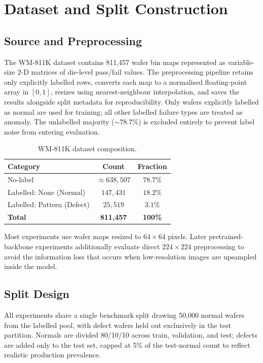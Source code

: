 \documentclass[11pt]{article}
\begin{document}
\section{Dataset and Split Construction}

\subsection{Source and Preprocessing}

The WM-811K dataset contains 811,457 wafer bin maps represented as variable-size
2-D matrices of die-level pass/fail values. The preprocessing pipeline retains
only explicitly labelled rows, converts each map to a normalised floating-point
array in $[0, 1]$, resizes using nearest-neighbour interpolation, and saves
the results alongside split metadata for reproducibility. Only wafers explicitly
labelled as normal are used for training; all other labelled failure types are
treated as anomaly. The unlabelled majority (${\sim}78.7\%$) is excluded
entirely to prevent label noise from entering evaluation.

\begin{table}[H]
\centering
\caption{WM-811K dataset composition.}
\label{tab:dataset_distribution}
\begin{tabular}{lcc}
\toprule
Category & Count & Fraction \\
\midrule
No-label & ${\approx}638{,}507$ & $78.7\%$ \\
Labelled: None (Normal) & $147{,}431$ & $18.2\%$ \\
Labelled: Pattern (Defect) & $25{,}519$ & $3.1\%$ \\
\midrule
\textbf{Total} & \textbf{811,457} & \textbf{100\%} \\
\bottomrule
\end{tabular}
\end{table}

Most experiments use wafer maps resized to $64\!\times\!64$ pixels. Later
pretrained-backbone experiments additionally evaluate direct $224\!\times\!224$
preprocessing to avoid the information loss that occurs when low-resolution
images are upsampled inside the model.

\subsection{Split Design}

All experiments share a single benchmark split drawing 50,000 normal wafers
from the labelled pool, with defect wafers held out exclusively in the test
partition. Normals are divided 80/10/10 across train, validation, and test;
defects are added only to the test set, capped at 5\% of the test-normal
count to reflect realistic production prevalence.
\end{document}
